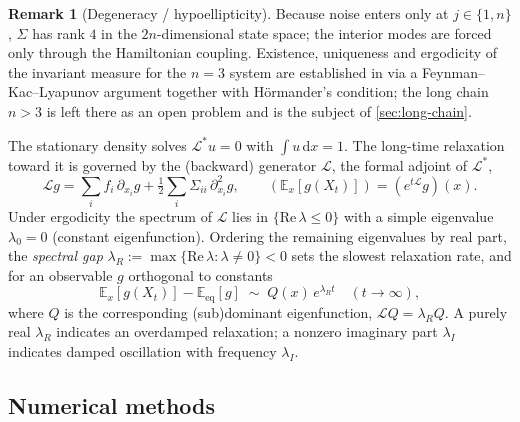 \documentclass[11pt,a4paper]{article}
\theoremstyle{definition}
\newtheorem{remark}[theorem]{Remark}
\newcommand{\E}{\mathbb{E}}
\newcommand{\dd}{\,\mathrm{d}}
\numberwithin{equation}{section}   %
\newcommand{\Lgen}{\mathcal{L}}
\newcommand{\Ladj}{\mathcal{L}^{*}}
\begin{document}
\begin{remark}[Degeneracy / hypoellipticity]\label{rem:hypo}
Because noise enters only at $j\in\{1,n\}$, $\Sigma$ has rank $4$ in the
$2n$-dimensional state space; the interior modes are forced only through the
Hamiltonian coupling. Existence, uniqueness and ergodicity of the invariant
measure for the $n=3$ system are established in \cite{HLNS} via a
Feynman--Kac--Lyapunov argument together with H\"ormander's condition; the long
chain $n>3$ is left there as an open problem and is the subject of
\cref{sec:long-chain}.
\end{remark}

The stationary density solves $\Ladj u = 0$ with $\int u\dd x = 1$. The
long-time relaxation toward it is governed by the (backward) generator $\Lgen$,
the formal adjoint of $\Ladj$,
\begin{equation}\label{eq:generator}
  \Lgen g = \sum_i f_i\,\partial_{x_i} g
          + \tfrac12\sum_i \Sigma_{ii}\,\partial^2_{x_i} g,
  \qquad
  (\E_x[g(X_t)]) = (e^{t\Lgen} g)(x).
\end{equation}
Under ergodicity the spectrum of $\Lgen$ lies in $\{\mathrm{Re}\,\lambda\le 0\}$
with a simple eigenvalue $\lambda_0=0$ (constant eigenfunction). Ordering the
remaining eigenvalues by real part, the \emph{spectral gap}
$\lambda_R := \max\{\mathrm{Re}\,\lambda : \lambda\neq 0\}<0$ sets the slowest
relaxation rate, and for an observable $g$ orthogonal to constants
\begin{equation}\label{eq:decay}
  \E_x[g(X_t)] - \E_{\mathrm{eq}}[g]
  \;\sim\; Q(x)\,e^{\lambda_R t}\quad (t\to\infty),
\end{equation}
where $Q$ is the corresponding (sub)dominant eigenfunction, $\Lgen Q =
\lambda_R Q$. A purely real $\lambda_R$ indicates an overdamped relaxation; a
nonzero imaginary part $\lambda_I$ indicates damped oscillation with frequency
$\lambda_I$.

\subsection{Numerical methods}\label{sec:methods}
\end{document}
